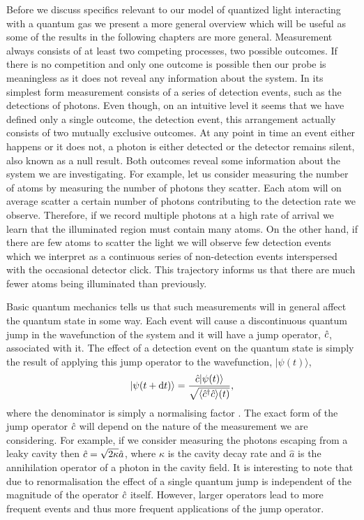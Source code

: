 Before we discuss specifics relevant to our model of quantized light
interacting with a quantum gas we present a more general overview
which will be useful as some of the results in the following chapters
are more general. Measurement always consists of at least two
competing processes, two possible outcomes. If there is no competition
and only one outcome is possible then our probe is meaningless as it
does not reveal any information about the system. In its simplest form
measurement consists of a series of detection events, such as the
detections of photons. Even though, on an intuitive level it seems
that we have defined only a single outcome, the detection event, this
arrangement actually consists of two mutually exclusive outcomes. At
any point in time an event either happens or it does not, a photon is
either detected or the detector remains silent, also known as a null
result. Both outcomes reveal some information about the system we are
investigating. For example, let us consider measuring the number of
atoms by measuring the number of photons they scatter. Each atom will
on average scatter a certain number of photons contributing to the
detection rate we observe. Therefore, if we record multiple photons at
a high rate of arrival we learn that the illuminated region must
contain many atoms. On the other hand, if there are few atoms to
scatter the light we will observe few detection events which we
interpret as a continuous series of non-detection events interspersed
with the occasional detector click. This trajectory informs us that
there are much fewer atoms being illuminated than previously.

Basic quantum mechanics tells us that such measurements will in
general affect the quantum state in some way. Each event will cause a
discontinuous quantum jump in the wavefunction of the system and it
will have a jump operator, $\hat{c}$, associated with it. The effect of a
detection event on the quantum state is simply the result of applying
this jump operator to the wavefunction, $| \psi (t) \rangle$,
\begin{equation}
  \label{eq:jump}
  | \psi(t + \mathrm{d}t) \rangle = \frac{\hat{c} | \psi(t) \rangle}
  {\sqrt{\langle \hat{c}^\dagger \hat{c} \rangle (t)}},
\end{equation}
where the denominator is simply a normalising factor
\cite{MeasurementControl}. The exact form of the jump operator $\hat{c}$
will depend on the nature of the measurement we are considering. For
example, if we consider measuring the photons escaping from a leaky
cavity then $\hat{c} = \sqrt{2 \kappa} \hat{a}$, where $\kappa$ is the
cavity decay rate and $\hat{a}$ is the annihilation operator of a
photon in the cavity field. It is interesting to note that due to
renormalisation the effect of a single quantum jump is independent of
the magnitude of the operator $\hat{c}$ itself. However, larger operators
lead to more frequent events and thus more frequent applications of
the jump operator.


